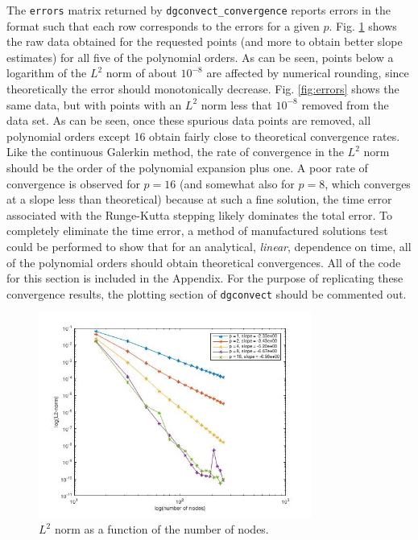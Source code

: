 \documentclass[10pt]{article}
\begin{document}
The {\tt errors} matrix returned by {\tt dgconvect\_convergence} reports errors in the format such that each row corresponds to the errors for a given \(p\). Fig. \ref{fig:errors_raw} shows the raw data obtained for the requested points (and more to obtain better slope estimates) for all five of the polynomial orders. As can be seen, points below a logarithm of the \(L^2\) norm of about \(10^{-8}\) are affected by numerical rounding, since theoretically the error should monotonically decrease. Fig. \ref{fig:errors} shows the same data, but with points with an \(L^2\) norm less that \(10^{-8}\) removed from the data set. As can be seen, once these spurious data points are removed, all polynomial orders except 16 obtain fairly close to theoretical convergence rates. Like the continuous Galerkin method, the rate of convergence in the \(L^2\) norm should be the order of the polynomial expansion plus one. A poor rate of convergence is observed for \(p=16\) (and somewhat also for \(p=8\), which converges at a slope less than theoretical) because at such a fine solution, the time error associated with the Runge-Kutta stepping likely dominates the total error. To completely eliminate the time error, a method of manufactured solutions test could be performed to show that for an analytical, \textit{linear}, dependence on time, all of the polynomial orders should obtain theoretical convergences. All  of the code for this section is included in the Appendix. For the purpose of replicating these convergence results, the plotting section of {\tt dgconvect} should be commented out.

\begin{figure}[H]
\centering
\includegraphics[width=0.8\textwidth]{figures/errors_raw.jpg}
\caption{\(L^2\) norm as a function of the number of nodes.}
\label{fig:errors_raw}
\end{figure}
\end{document}
